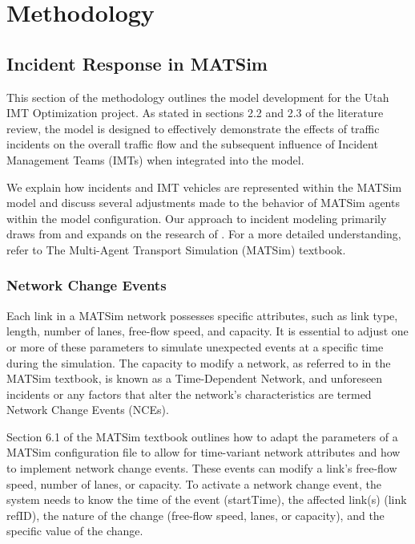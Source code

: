 \documentclass[
  letterpaper,
  authoryear]{elsarticle}
\begin{document}

\hypertarget{methodology}{%
\section{Methodology}\label{methodology}}

\hypertarget{incident-response-in-matsim}{%
\subsection{Incident Response in
MATSim}\label{incident-response-in-matsim}}

This section of the methodology outlines the model development for the
Utah IMT Optimization project. As stated in sections 2.2 and 2.3 of the
literature review, the model is designed to effectively demonstrate the
effects of traffic incidents on the overall traffic flow and the
subsequent influence of Incident Management Teams (IMTs) when integrated
into the model.

We explain how incidents and IMT vehicles are represented within the
MATSim model and discuss several adjustments made to the behavior of
MATSim agents within the model configuration. Our approach to incident
modeling primarily draws from and expands on the research of
\citet{kaddoura2016}. For a more detailed understanding, refer to The
Multi-Agent Transport Simulation (MATSim) textbook.

\hypertarget{network-change-events}{%
\subsubsection{Network Change Events}\label{network-change-events}}

Each link in a MATSim network possesses specific attributes, such as
link type, length, number of lanes, free-flow speed, and capacity. It is
essential to adjust one or more of these parameters to simulate
unexpected events at a specific time during the simulation. The capacity
to modify a network, as referred to in the MATSim textbook, is known as
a Time-Dependent Network, and unforeseen incidents or any factors that
alter the network's characteristics are termed Network Change Events
(NCEs).

Section 6.1 of the MATSim textbook outlines how to adapt the parameters
of a MATSim configuration file to allow for time-variant network
attributes and how to implement network change events. These events can
modify a link's free-flow speed, number of lanes, or capacity. To
activate a network change event, the system needs to know the time of
the event (startTime), the affected link(s) (link refID), the nature of
the change (free-flow speed, lanes, or capacity), and the specific value
of the change.
\end{document}
